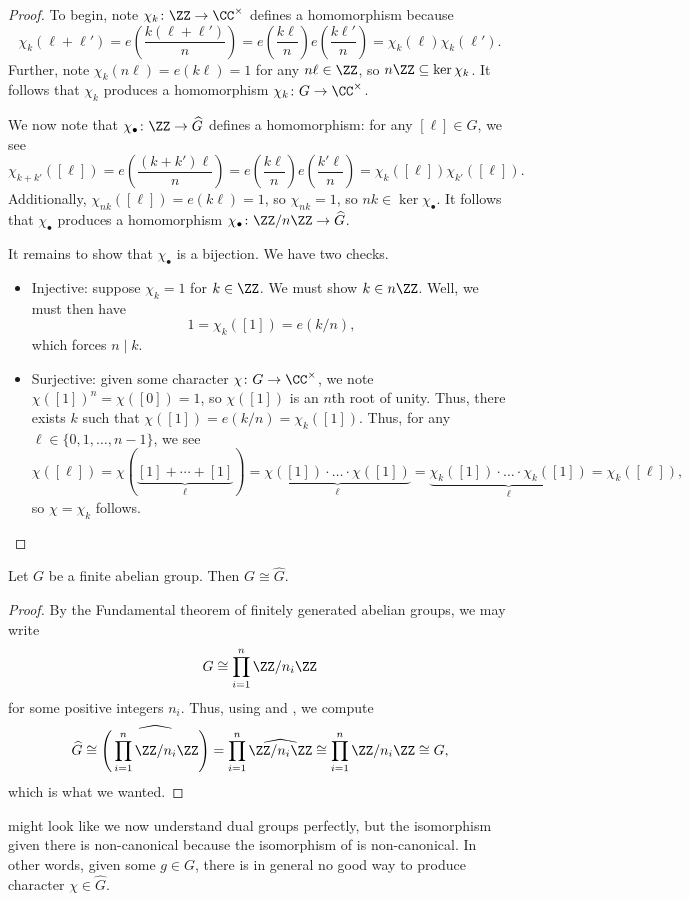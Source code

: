 \documentclass[../notes.tex]{subfiles}
\begin{document}
\begin{proof}
	To begin, note $\chi_k\colon\ZZ\to\CC^\times$ defines a homomorphism because
	\[\chi_k(\ell+\ell')=e\left(\frac{k(\ell+\ell')}n\right)=e\left(\frac{k\ell}n\right)e\left(\frac{k\ell'}n\right)=\chi_k(\ell)\chi_k(\ell').\]
	Further, note $\chi_k(n\ell)=e(k\ell)=1$ for any $n\ell\in\ZZ$, so $n\ZZ\subseteq\ker\chi_k$. It follows that $\chi_k$ produces a homomorphism $\chi_k\colon G\to\CC^\times$.

	We now note that $\chi_\bullet\colon\ZZ\to \widehat{G}$ defines a homomorphism: for any $[\ell]\in G$, we see
	\[\chi_{k+k'}([\ell])=e\left(\frac{(k+k')\ell}n\right)=e\left(\frac{k\ell}n\right)e\left(\frac{k'\ell}n\right)=\chi_k([\ell])\chi_{k'}([\ell]).\]
	Additionally, $\chi_{nk}([\ell])=e(k\ell)=1$, so $\chi_{nk}=1$, so $nk\in\ker\chi_\bullet$. It follows that $\chi_\bullet$ produces a homomorphism $\chi_\bullet\colon\ZZ/n\ZZ\to \widehat{G}$.

	It remains to show that $\chi_\bullet$ is a bijection. We have two checks.
	\begin{itemize}
		\item Injective: suppose $\chi_k=1$ for $k\in\ZZ$. We must show $k\in n\ZZ$. Well, we must then have
		\[1=\chi_k([1])=e(k/n),\]
		which forces $n\mid k$.
		\item Surjective: given some character $\chi\colon G\to\CC^\times$, we note $\chi([1])^n=\chi([0])=1$, so $\chi([1])$ is an $n$th root of unity. Thus, there exists $k$ such that $\chi([1])=e(k/n)=\chi_k([1])$. Thus, for any $\ell\in\{0,1,\ldots,n-1\}$, we see
		\[\chi([\ell])=\chi(\underbrace{[1]+\cdots+[1]}_\ell)=\underbrace{\chi([1])\cdot\ldots\cdot\chi([1])}_\ell=\underbrace{\chi_k([1])\cdot\ldots\cdot\chi_k([1])}_\ell=\chi_k([\ell]),\]
		so $\chi=\chi_k$ follows.
		\qedhere
	\end{itemize}
\end{proof}
\begin{proposition} \label{prop:g-cong-g-dual}
	Let $G$ be a finite abelian group. Then $G\cong \widehat{G}$.
\end{proposition}
\begin{proof}
	By the Fundamental theorem of finitely generated abelian groups, we may write
	\[G\cong\prod_{i=1}^n\ZZ/n_i\ZZ\]
	for some positive integers $n_i$. Thus, using  and , we compute
	\[\widehat{G}\cong\widehat{\Bigg(\prod_{i=1}^n\ZZ/n_i\ZZ\Bigg)}=\prod_{i=1}^n\widehat{\ZZ/n_i\ZZ}\cong\prod_{i=1}^n\ZZ/n_i\ZZ\cong G,\]
	which is what we wanted.
\end{proof}
 might look like we now understand dual groups perfectly, but the isomorphism given there is non-canonical because the isomorphism of  is non-canonical. In other words, given some $g\in G$, there is in general no good way to produce character $\chi\in \widehat{G}$.
\end{document}
